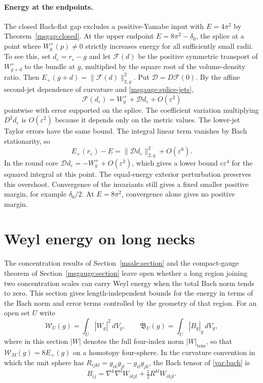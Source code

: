 \documentclass[11pt]{article}
\numberwithin{equation}{section}
\theoremstyle{definition}
\theoremstyle{remark}
\begin{document}
\paragraph{Energy at the endpoints.}
The closed Bach-flat gap excludes a positive-Yamabe input with
\(E=4\pi^2\) by Theorem~\ref{msgap:closed}. At the upper endpoint
\(E=8\pi^2-\delta_0\), the splice at a point where \(W_g^+(p)\ne0\)
strictly increases energy for all sufficiently small radii.
To see this, set \(d_\varepsilon=r_\varepsilon-g\) and let
\(\mathcal F(d)\) be the positive symmetric transport of \(W^+_{g+d}\)
to the bundle at \(g\), multiplied by the square root of the
volume-density ratio. Then
\(E_+(g+d)=\|\mathcal F(d)\|_{2,g}^2\). Put
\(\mathcal D=D\mathcal F(0)\). By the affine second-jet dependence
of curvature and \eqref{msgauge:splice-jets},
\[
 \mathcal F(d_\varepsilon)=W_g^+ +\mathcal D d_\varepsilon
                       +O(\varepsilon^2)
\]
pointwise with error supported on the splice. The coefficient
variation multiplying \(D^2d_\varepsilon\) is \(O(\varepsilon^2)\)
because it depends only on the metric values. The lower-jet Taylor
errors have the same bound. The integral linear term vanishes
by Bach stationarity, so
\[
 E_+(r_\varepsilon)-E
     =\|\mathcal D d_\varepsilon\|_{2,g}^2+O(\varepsilon^6).
\]
In the round core \(\mathcal D d_\varepsilon=-W_g^+
+O(\varepsilon^2)\), which gives a lower bound
\(c\varepsilon^4\) for the squared integral at this point.
The equal-energy exterior perturbation preserves this overshoot.
Convergence of the invariants still gives a fixed smaller positive
margin, for example \(\delta_0/2\). At \(E=8\pi^2\), convergence
alone gives no positive margin.

\section{Weyl energy on long necks}
\label{msneck:section}

The concentration results of Section~\ref{msale:section} and the
compact-gauge theorem of Section~\ref{msgauge:section} leave open
whether a long region joining two concentration scales can carry
Weyl energy when the total Bach norm tends to zero. This section gives
length-independent bounds for the energy in terms of the Bach norm
and error terms controlled by the geometry of that region. For an open set
\(U\) write
\[
 \mathcal W_U(g)=\int_U|W_g|^2\,dV_g,\qquad
 \mathfrak B_U(g)=\int_U|B_g|_g\,dV_g ,
\]
where in this section \(|W|\) denotes the full four-index norm
\(|W|_{\mathrm{tens}}\), so that \(\mathcal W_M(g)=8E_+(g)\) on a
homotopy four-sphere. In the curvature convention in which the unit
sphere has \(R_{ijkl}=g_{ik}g_{jl}-g_{il}g_{jk}\), the Bach tensor of
\eqref{var:bach} is
\begin{equation}\label{msneck:bach}
 B_{ij}=\nabla^k\nabla^lW_{ikjl}+\tfrac12R^{kl}W_{ikjl}.
\end{equation}
\end{document}
